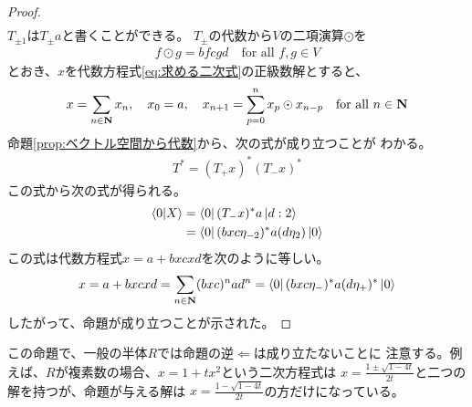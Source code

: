 {\begin{proof}
\begin{equation*}
\begin{split}
		\end{split}\end{equation*}
		$T_{\pm1}$は$T_\pm a$と書くことができる。
		$T_\pm$の代数から$V$の二項演算$\odot$を
		\begin{equation*}\begin{split}
			f\odot g = bfcgd \quad\text{for all } f,g\in V
		\end{split}\end{equation*}
		とおき、$x$を代数方程式\eqref{eq:求める二次式}の正級数解とすると、
		\begin{equation*}\begin{split}
			x = \sum_{n\in\mathbf{N}} x_n,\quad
			x_0 = a,\quad x_{n+1} = \sum_{p=0}^n x_p\odot x_{n-p}
			\quad\text{for all } n\in\mathbf{N}
		\end{split}\end{equation*}
		命題\eqref{prop:ベクトル空間から代数}から、次の式が成り立つことが
		わかる。
		\begin{equation*}\begin{split}
			T^* = (T_+x)^*(T_-x)^*
		\end{split}\end{equation*}
		この式から次の式が得られる。
		\begin{equation*}\begin{split}
			\mathinner{\langle{0|X}\rangle} &= \mathinner{\langle{0}|}(T_-x)^*a\mathinner{|{d:2}\rangle} \\
			&= \mathinner{\langle{0}|}(bxc\eta_{-2})^*a(d\eta_2)\mathinner{|{0}\rangle} \\
		\end{split}\end{equation*}
		この式は代数方程式$x=a+bxcxd$を次のように等しい。
		\begin{equation*}\begin{split}
			x = a+bxcxd = \sum_{n\in\mathbf{N}} (bxc)^nad^n
			= \mathinner{\langle{0}|}(bxc\eta_-)^*a(d\eta_+)^*\mathinner{|{0}\rangle}
		\end{split}\end{equation*}
		したがって、命題が成り立つことが示された。
	\end{proof} %

	この命題で、一般の半体$R$では命題の逆$\Leftarrow$は成り立たないことに
	注意する。例えば、$R$が複素数の場合、$x=1+tx^2$という二次方程式は
	$x=\frac{1\pm\sqrt{1-4t}}{2t}$と二つの解を持つが、命題が与える解は
	$x=\frac{1-\sqrt{1-4t}}{2t}$の方だけになっている。

}

